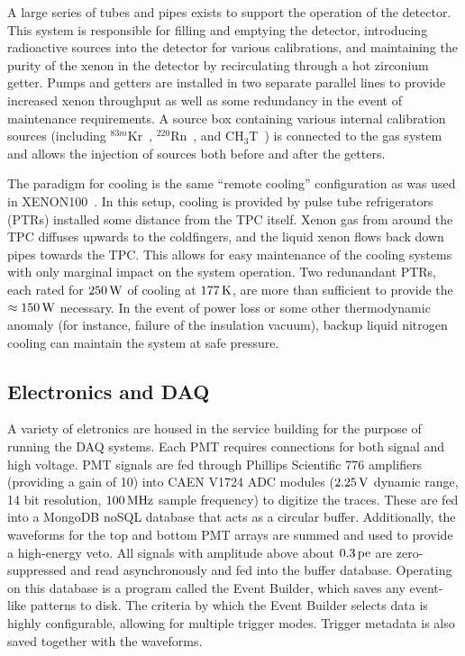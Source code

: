 A large series of tubes and pipes exists to support the operation of the detector. This system is responsible for filling and emptying the detector, introducing radioactive sources into the detector for various calibrations, and maintaining the purity of the xenon in the detector by recirculating through a hot zirconium getter. Pumps and getters are installed in two separate parallel lines to provide increased xenon throughput as well as some redundancy in the event of maintenance requirements. A source box containing various internal calibration sources (including $^{83m}$Kr~\cite{Kastens:2010,Akerib:2017eql}, $^{220}$Rn~\cite{Aprile:2016pmc,Lang:2016zde}, and CH$_3$T~\cite{Akerib:2015wdi}) is connected to the gas system and allows the injection of sources both before and after the getters.

The paradigm for cooling is the same ``remote cooling'' configuration as was used in XENON100~\cite{Aprile:2011dd}. In this setup, cooling is provided by pulse tube refrigerators (PTRs) installed some distance from the TPC itself. Xenon gas from around the TPC diffuses upwards to the coldfingers, and the liquid xenon flows back down pipes towards the TPC. This allows for easy maintenance of the cooling systems with only marginal impact on the system operation. Two redunandant PTRs, each rated for $250\, \mathrm{W}$ of cooling at $177\, \mathrm{K}$, are more than sufficient to provide the $\approx 150\, \mathrm{W}$ necessary. In the event of power loss or some other thermodynamic anomaly (for instance, failure of the insulation vacuum), backup liquid nitrogen cooling can maintain the system at safe pressure.

\subsection{Electronics and DAQ}

A variety of eletronics are housed in the service building for the purpose of running the DAQ systems. Each PMT requires connections for both signal and high voltage. PMT signals are fed through Phillips Scientific 776 amplifiers (providing a gain of 10) into CAEN V1724 ADC modules ($2.25\, \mathrm{V}$ dynamic range, 14 bit resolution, $100\, \mathrm{MHz}$ sample frequency) to digitize the traces. These are fed into a MongoDB noSQL database that acts as a circular buffer. Additionally, the waveforms for the top and bottom PMT arrays are summed and used to provide a high-energy veto. All signals with amplitude above about $0.3\, \mathrm{pe}$ are zero-suppressed and read asynchronously and fed into the buffer database. Operating on this database is a program called the Event Builder, which saves any event-like patterns to disk. The criteria by which the Event Builder selects data is highly configurable, allowing for multiple trigger modes. Trigger metadata is also saved together with the waveforms.

